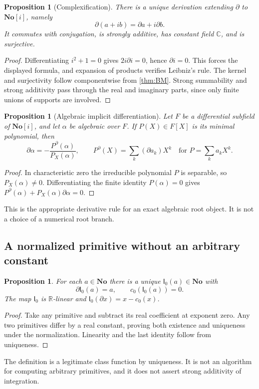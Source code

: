 \documentclass[11pt,a4paper]{article}
\newtheorem{proposition}[theorem]{Proposition}
\theoremstyle{definition}
\newcommand{\No}{\mathbf{No}}
\newcommand{\SC}{\mathbf{No}[i]}
\newcommand{\R}{\mathbb R}
\newcommand{\C}{\mathbb C}
\newcommand{\D}{\partial}
\newcommand{\Ip}{\mathsf I_0}
\numberwithin{equation}{section}
\begin{document}
\begin{proposition}[Complexification]\label{prop:complexification}
There is a unique derivation extending $\D$ to $\SC$, namely
\[
 \D(a+ib)=\D a+i\D b.
\]
It commutes with conjugation, is strongly additive, has constant field
$\C$, and is surjective.
\end{proposition}
\begin{proof}
Differentiating $i^2+1=0$ gives $2i\D i=0$, hence $\D i=0$. This forces
the displayed formula, and expansion of products verifies Leibniz's rule.
The kernel and surjectivity follow componentwise from \cref{thm:BM}.
Strong summability and strong additivity pass through the real and
imaginary parts, since only finite unions of supports are involved.
\end{proof}

\begin{proposition}[Algebraic implicit differentiation]\label{prop:algdiff}
Let $F$ be a differential subfield of $\SC$, and let $\alpha$ be algebraic
over $F$. If $P(X)\in F[X]$ is its minimal polynomial, then
\[
 \D\alpha=-\frac{P^\D(\alpha)}{P_X(\alpha)},\qquad
 P^\D(X)=\sum_k(\D a_k)X^k\quad\text{for }P=\sum_k a_kX^k.
\]
\end{proposition}
\begin{proof}
In characteristic zero the irreducible polynomial $P$ is separable, so
$P_X(\alpha)\ne0$. Differentiating the finite identity $P(\alpha)=0$ gives
$P^\D(\alpha)+P_X(\alpha)\D\alpha=0$.
\end{proof}
This is the appropriate derivative rule for an exact algebraic root
object. It is not a choice of a numerical root branch.

\subsection{A normalized primitive without an arbitrary constant}
\begin{proposition}\label{prop:normalizedprimitive}
For each $a\in\No$ there is a unique $\Ip(a)\in\No$ with
\[
 \D\Ip(a)=a,\qquad c_0(\Ip(a))=0.
\]
The map $\Ip$ is $\R$-linear and
$\Ip(\D x)=x-c_0(x)$.
\end{proposition}
\begin{proof}
Take any primitive and subtract its real coefficient at exponent zero.
Any two primitives differ by a real constant, proving both existence and
uniqueness under the normalization. Linearity and the last identity follow
from uniqueness.
\end{proof}
The definition is a legitimate class function by uniqueness. It is not an
algorithm for computing arbitrary primitives, and it does not assert
strong additivity of integration.
\end{document}
